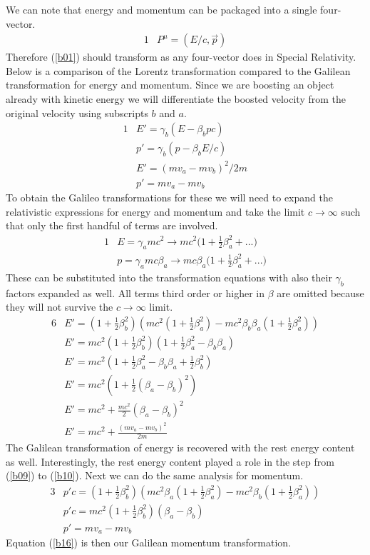 \documentclass[]{article}
\numberwithin{equation}{subsection}
\begin{document}
\noindent We can note that energy and momentum can be packaged into a single four-vector.
\begin{alignat}{1}
	\label{b01}	&P^{\mu}=(E/c,\vec{p})
\end{alignat}
Therefore (\ref{b01}) should transform as any four-vector does in Special Relativity. Below is a comparison of the Lorentz transformation compared to the Galilean transformation for energy and momentum. Since we are boosting an object already with kinetic energy we will differentiate the boosted velocity from the original velocity using subscripts $b$ and $a$.
\begin{alignat}{1}
	\label{b02}	&E'=\gamma_{b}(E-\beta_{b} pc)\\
	\label{b03}	&p'=\gamma_{b}(p-\beta_{b}E/c)\\
	\label{b04}	&E'=(mv_{a}-mv_{b})^{2}/2m\\
	\label{b05}	&p'=mv_{a}-mv_{b}
\end{alignat}
To obtain the Galileo transformations for these we will need to expand the relativistic expressions for energy and momentum and take the limit $c\rightarrow\infty$ such that only the first handful of terms are involved. 
\begin{alignat}{1}
	\label{b06}	&E=\gamma_{a} mc^{2}\rightarrow mc^{2}\big(1+\frac{1}{2}\beta_{a}^{2}+...\big)\\
	\label{b07}	&p=\gamma_{a} mc\beta_{a}\rightarrow mc\beta_{a}\big(1+\frac{1}{2}\beta_{a}^{2}+...\big)
\end{alignat}
These can be substituted into the transformation equations with also their $\gamma_{b}$ factors expanded as well. All terms third order or higher in $\beta$ are omitted because they will not survive the $c\rightarrow\infty$ limit.
\begin{alignat}{6}
	\label{b08}	&E'=(1+\frac{1}{2}\beta_{b}^{2})(mc^{2}(1+\frac{1}{2}\beta_{a}^{2})-mc^{2}\beta_{b}\beta_{a}(1+\frac{1}{2}\beta_{a}^{2}))\\
	\label{b09}	&E'=mc^{2}(1+\frac{1}{2}\beta_{b}^{2})(1+\frac{1}{2}\beta_{a}^{2}-\beta_{b}\beta_{a})\\
	\label{b10}	&E'=mc^{2}(1+\frac{1}{2}\beta_{a}^{2}-\beta_{b}\beta_{a}+\frac{1}{2}\beta_{b}^{2})\\
	\label{b11}	&E'=mc^{2}(1+\frac{1}{2}(\beta_{a}-\beta_{b})^{2})\\
	\label{b12}	&E'=mc^{2}+\frac{mc^{2}}{2}(\beta_{a}-\beta_{b})^{2}\\
	\label{b13}	&E'=mc^{2}+\frac{(mv_{a}-mv_{b})^{2}}{2m}		
\end{alignat}
The Galilean transformation of energy is recovered with the rest energy content as well. Interestingly, the rest energy content played a role in the step from (\ref{b09}) to (\ref{b10}). Next we can do the same analysis for momentum.
\begin{alignat}{3}
	\label{b14}	&p'c=(1+\frac{1}{2}\beta_{b}^{2})(mc^{2}\beta_{a}(1+\frac{1}{2}\beta_{a}^{2})-mc^{2}\beta_{b}(1+\frac{1}{2}\beta_{a}^{2}))\\
	\label{b15}	&p'c=mc^{2}(1+\frac{1}{2}\beta_{b}^{2})(\beta_{a}-\beta_{b})\\
	\label{b16}	&p'=mv_{a}-mv_{b}
\end{alignat}
Equation (\ref{b16}) is then our Galilean momentum transformation.
\end{document}
